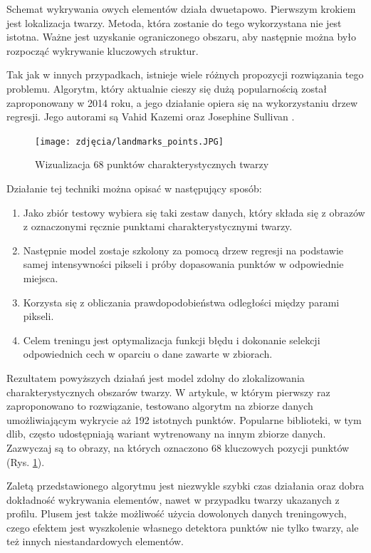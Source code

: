 Schemat wykrywania owych elementów działa dwuetapowo. Pierwszym krokiem jest lokalizacja twarzy. Metoda, która zostanie do tego wykorzystana nie jest istotna. Ważne jest uzyskanie ograniczonego obszaru, aby następnie można było rozpocząć wykrywanie kluczowych struktur. 

Tak jak w innych przypadkach, istnieje wiele różnych propozycji rozwiązania tego problemu. Algorytm, który aktualnie cieszy się dużą popularnością został zaproponowany w 2014 roku, a jego działanie opiera się na wykorzystaniu drzew regresji. Jego autorami są Vahid Kazemi oraz Josephine Sullivan \cite{landmarks}. 

\begin{figure}[h]
	\centering
	\texttt{[image: zdjęcia/landmarks\_points.JPG]}
	\caption{Wizualizacja 68 punktów charakterystycznych twarzy} 
	\label{fig:landmarks}
\end{figure}

Działanie tej techniki można opisać w następujący sposób:
\begin{enumerate}
    \item Jako zbiór testowy wybiera się taki zestaw danych, który składa się z obrazów z oznaczonymi ręcznie punktami charakterystycznymi twarzy.
    \item Następnie model zostaje szkolony za pomocą drzew regresji na podstawie samej intensywności pikseli i próby dopasowania punktów w odpowiednie miejsca.
    \item  Korzysta się z obliczania prawdopodobieństwa odległości między parami pikseli.
    \item Celem treningu jest optymalizacja funkcji błędu i dokonanie selekcji odpowiednich cech w oparciu o dane zawarte w zbiorach.
\end{enumerate}

Rezultatem powyższych działań jest model zdolny do zlokalizowania charakterystycznych obszarów twarzy. W artykule, w którym pierwszy raz zaproponowano to rozwiązanie, testowano algorytm na zbiorze danych umożliwiającym wykrycie aż 192 istotnych punktów. Popularne biblioteki, w tym dlib, często udostępniają wariant wytrenowany na innym zbiorze danych. Zazwyczaj są to obrazy, na których oznaczono 68 kluczowych pozycji punktów (Rys. \ref{fig:landmarks}).

Zaletą przedstawionego algorytmu jest niezwykle szybki czas działania oraz dobra dokładność wykrywania elementów, nawet w przypadku twarzy ukazanych z profilu. Plusem jest także możliwość użycia dowolonych danych treningowych, czego efektem jest wyszkolenie własnego detektora punktów nie tylko twarzy, ale też innych niestandardowych elementów.

